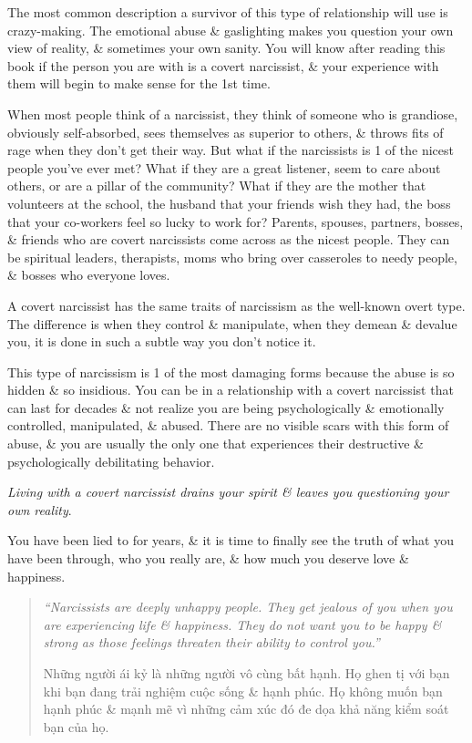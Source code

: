 \documentclass{article}
\begin{document}
\begin{enumerate}
	The most common description a survivor of this type of relationship will use is crazy-making. The emotional abuse \& gaslighting makes you question your own view of reality, \& sometimes your own sanity. You will know after reading this book if the person you are with is a covert narcissist, \& your experience with them will begin to make sense for the 1st time.
	
	When most people think of a narcissist, they think of someone who is grandiose, obviously self-absorbed, sees themselves as superior to others, \& throws fits of rage when they don't get their way. But what if the narcissists is 1 of the nicest people you've ever met? What if they are a great listener, seem to care about others, or are a pillar of the community? What if they are the mother that volunteers at the school, the husband that your friends wish they had, the boss that your co-workers feel so lucky to work for? Parents, spouses, partners, bosses, \& friends who are covert narcissists come across as the nicest people. They can be spiritual leaders, therapists, moms who bring over casseroles to needy people, \& bosses who everyone loves.
	
	A covert narcissist has the same traits of narcissism as the well-known overt type. The difference is when they control \& manipulate, when they demean \& devalue you, it is done in such a subtle way you don't notice it.
	
	This type of narcissism is 1 of the most damaging forms because the abuse is so hidden \& so insidious. You can be in a relationship with a covert narcissist that can last for decades \& not realize you are being psychologically \& emotionally controlled, manipulated, \& abused. There are no visible scars with this form of abuse, \& you are usually the only one that experiences their destructive \& psychologically debilitating behavior.
	
	{\it Living with a covert narcissist drains your spirit \& leaves you questioning your own reality}.
	
	You have been lied to for years, \& it is time to finally see the truth of what you have been through, who you really are, \& how much you deserve love \& happiness.
	\begin{quotation}
		{\it``Narcissists are deeply unhappy people. They get jealous of you when you are experiencing life \& happiness. They do not want you to be happy \& strong as those feelings threaten their ability to control you.''}
		
		Những người ái kỷ là những người vô cùng bất hạnh. Họ ghen tị với bạn khi bạn đang trải nghiệm cuộc sống \& hạnh phúc. Họ không muốn bạn hạnh phúc \& mạnh mẽ vì những cảm xúc đó đe dọa khả năng kiểm soát bạn của họ.
		

\end{quotation}
\end{enumerate}
\end{document}
